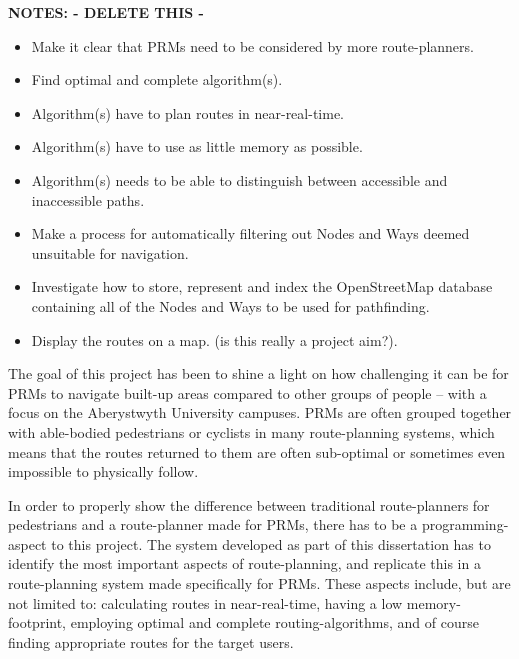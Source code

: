 \textbf{NOTES: - DELETE THIS -}
\begin{itemize}
	\item Make it clear that PRMs need to be considered by more route-planners.
\\
	\item Find optimal and complete algorithm(s).
	\item Algorithm(s) have to plan routes in near-real-time.
	\item Algorithm(s) have to use as little memory as possible.
	\item Algorithm(s) needs to be able to distinguish between accessible and inaccessible paths.
	\item Make a process for automatically filtering out Nodes and Ways deemed unsuitable for navigation.
\\
	\item Investigate how to store, represent and index the OpenStreetMap database containing all of the Nodes and Ways to be used for pathfinding.
	\item Display the routes on a map. (is this really a project aim?).
\end{itemize}

The goal of this project has been to shine a light on how challenging it can be for PRMs to navigate built-up areas compared to other groups of people -- with a focus on the Aberystwyth University campuses. PRMs are often grouped together with able-bodied pedestrians or cyclists in many route-planning systems, which means that the routes returned to them are often sub-optimal or sometimes even impossible to physically follow.

In order to properly show the difference between traditional route-planners for pedestrians and a route-planner made for PRMs, there has to be a programming-aspect to this project.
The system developed as part of this dissertation has to identify the most important aspects of route-planning, and replicate this in a route-planning system made specifically for PRMs.
These aspects include, but are not limited to: calculating routes in near-real-time, having a low memory-footprint, employing optimal and complete routing-algorithms, and of course finding appropriate routes for the target users.

